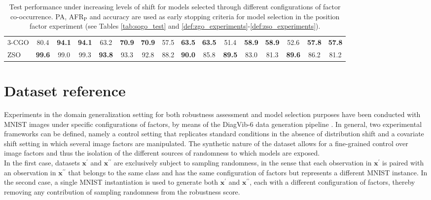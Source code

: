 \begin{table}[H]
{\begin{tabular}{l|ccc|ccc|ccc|ccc|ccc}
    3-CGO & 80.4 & \textbf{94.1} & {\textbf{94.1}} & 63.2 & \textbf{70.9} & {\textbf{70.9}} & 57.5 & \textbf{63.5} & {\textbf{63.5}} & 51.4 & \textbf{58.9} & {\textbf{58.9}} & 52.6 & \textbf{57.8} & {\textbf{57.8}} \\
    ZSO & {\textbf{99.6}} & 99.0 & 99.3 & {\textbf{93.8}} & 93.3 & 92.8 & 88.2 & {\textbf{90.0}} & 85.8 & {\textbf{89.5}} & 83.0 & 81.3 & {\textbf{89.6}} & 86.2 & 81.2 \\
    \bottomrule
    \end{tabular}%
    }
    \caption{
        Test performance under increasing levels of shift for models selected through different configurations of factor
        co-occurrence. PA, AFR$_{\text{P}}$ and accuracy are used as early stopping criteria for model selection
        in the position factor experiment (see Tables \ref{tab:sogo_test} and \ref{def:zgo_experiments}-\ref{def:zso_experiments}).
    }
    \label{tab:sogo_pos_full}
\end{table}

\chapter{Dataset reference}\label{sec:datasets}

Experiments in the domain generalization setting for both robustness
assessment and model selection purposes have been conducted with
MNIST images under specific configurations of factors, by means of the
DiagVib-6 data generation pipeline
\cite{euligDiagViB6DiagnosticBenchmark2021}.
In general, two experimental frameworks can be defined, namely a control setting
that replicates standard conditions in the absence of distribution shift and
a covariate shift setting in which several image factors are manipulated. The synthetic
nature of the dataset allows for a fine-grained control over image factors and 
thus the isolation of the different sources of randomness
to which models are exposed. \\

In the first case, datasets $\bm{x}^\prime$ and 
$\bm{x}^{\prime \prime}$ are exclusively subject to sampling randomness, 
in the sense that each observation in $\bm{x}^\prime$ is paired with an 
observation in $\bm{x}^{\prime \prime}$ that belongs to the same class and has the same
configuration of factors but represents a different MNIST instance. In 
the second case, a single MNIST instantiation is used to generate both 
$\bm{x}^\prime$ and $\bm{x}^{\prime \prime}$, each with a different configuration of factors, 
thereby removing any contribution of sampling randomness from the robustness score.


